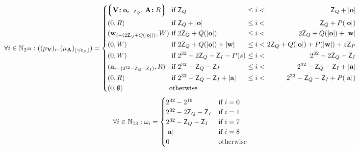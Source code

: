 \begin{equation}\label{eq:memlayout}
  \forall i \in \N_{2^{32}} : ((\mem_\mathbf{V})_i, (\mem_\mathbf{A})_{\floor{\nicefrac{i}{\mathsf{Z}_P}}}) = \left\{\begin{alignedat}{5}
    &\tup{\is{\mathbf{V}}{\mathbf{o}_{i - \mathsf{Z}_Q}}\ts\is{\mathbf{A}}{R}} &&\ \when
        \mathsf{Z}_Q
            &\ \leq i < \ &&
                \mathsf{Z}_Q + |\mathbf{o}|\\
    &(0, R) &&\ \when
        \mathsf{Z}_Q + |\mathbf{o}|
            &\ \leq i < \ &&
                \mathsf{Z}_Q + \rnp{|\mathbf{o}|} \\
    &(\mathbf{w}_{i - (2\mathsf{Z}_Q + \rnq{|\mathbf{o}|})}, W) &&\ \when
        2\mathsf{Z}_Q + \rnq{|\mathbf{o}|}
            &\ \leq i < \ &&
                2\mathsf{Z}_Q + \rnq{|\mathbf{o}|} + |\mathbf{w}|\\
    &(0, W) &&\ \when
        2\mathsf{Z}_Q + \rnq{|\mathbf{o}|} + |\mathbf{w}|
            &\ \leq i < \ &&
                2\mathsf{Z}_Q + \rnq{|\mathbf{o}|} + \rnp{|\mathbf{w}|} + z\mathsf{Z}_P\\
    &(0, W) &&\ \when
        2^{32} - 2\mathsf{Z}_Q - \mathsf{Z}_I - \rnp{s}
            &\ \leq i < \ &&
                2^{32} - 2\mathsf{Z}_Q - \mathsf{Z}_I\\
    &(\mathbf{a}_{i - (2^{32} - \mathsf{Z}_Q - \mathsf{Z}_I)}, R) &&\ \when
        2^{32} - \mathsf{Z}_Q - \mathsf{Z}_I
            &\ \leq i < \ &&
                2^{32} - \mathsf{Z}_Q - \mathsf{Z}_I + |\mathbf{a}|\\
    &(0, R) &&\ \when
        2^{32} - \mathsf{Z}_Q - \mathsf{Z}_I + |\mathbf{a}|
            &\ \leq i < \ &&
                2^{32} - \mathsf{Z}_Q - \mathsf{Z}_I + \rnp{|\mathbf{a}|}\\
    &(0, \none) &&\otherwise&&&
  \end{alignedat}\right.\\
\end{equation}
\begin{equation}\label{eq:registers}
  \forall i \in \mathbb{N}_{13} : \omega_i = \begin{cases}
      2^{32} - 2^{16} &\text{if } i = 0\\
      2^{32} - 2\mathsf{Z}_Q - \mathsf{Z}_I &\text{if } i = 1\\
      2^{32} - \mathsf{Z}_Q - \mathsf{Z}_I &\text{if } i = 7\\
      |\mathbf{a}|&\text{if } i = 8\\
      0 &\text{otherwise}
    \end{cases}
\end{equation}


